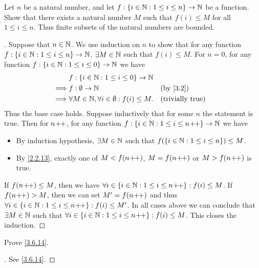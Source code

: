 \begin{ex}\label{ex:3.6.3}
	Let \(n\) be a natural number, and let \(f : \left\lbrace i \in \mathbb{N} : 1 \leq i \leq n\right\rbrace \to \mathbb{N}\) be a function.
	Show that there exists a natural number \(M\) such that \(f(i) \leq M\) for all \(1 \leq i \leq n\).
	Thus finite subsets of the natural numbers are bounded.
\end{ex}

\begin{proof}[]
	Suppose that \(n \in \mathbb{N}\).
	We use induction on \(n\) to show that for any function \(f : \left\lbrace i \in \mathbb{N} : 1 \leq i \leq n\right\rbrace \to \mathbb{N}\), \(\exists M \in \mathbb{N}\) such that \(f(i) \leq M\).
	For \(n = 0\), for any function \(f : \left\lbrace i \in \mathbb{N} : 1 \leq i \leq 0\right\rbrace \to \mathbb{N}\) we have
	\begin{align*}
		         & f : \set{i \in \N : 1 \leq i \leq 0} \to \N                                           \\
		\implies & f : \emptyset \to \N                                     &  & \by{3.2}                \\
		\implies & \forall M \in \N, \forall i \in \emptyset : f(i) \leq M. &  & \text{(trivially true)} \\
	\end{align*}
	Thus the base case holds.
	Suppose inductively that for some \(n\) the statement is true.
	Then for \(n\!+\!\!+\), for any function \(f : \left\lbrace i \in \mathbb{N} : 1 \leq i \leq n\!+\!\!+\right\rbrace \to \mathbb{N}\) we have
	\begin{itemize}
		\item By induction hypothesis, \(\exists M \in \mathbb{N}\) such that \(f(\left\lbrace i \in \mathbb{N} : 1 \leq i \leq n\right\rbrace) \leq M\).
		\item By \cref{2.2.13}, exactly one of \(M < f(n\!+\!\!+)\), \(M = f(n\!+\!\!+)\) or \(M > f(n\!+\!\!+)\) is true.
	\end{itemize}
	If \(f(n\!+\!\!+) \leq M\), then we have \(\forall i \in \left\lbrace i \in \mathbb{N} : 1 \leq i \leq n\!+\!\!+\right\rbrace : f(i) \leq M\).
	If \(f(n\!+\!\!+) > M\), then we can set \(M' = f(n\!+\!\!+)\) and thus \(\forall i \in \left\lbrace i \in \mathbb{N} : 1 \leq i \leq n\!+\!\!+\right\rbrace : f(i) \leq M'\).
	In all cases above we can conclude that \(\exists M \in \mathbb{N}\) such that \(\forall i \in \left\lbrace i \in \mathbb{N} : 1 \leq i \leq n\!+\!\!+\right\rbrace : f(i) \leq M\).
	This closes the induction.
\end{proof}

\begin{ex}\label{ex:3.6.4}
	Prove \cref{3.6.14}.
\end{ex}

\begin{proof}[]
	See \cref{3.6.14}.
\end{proof}

